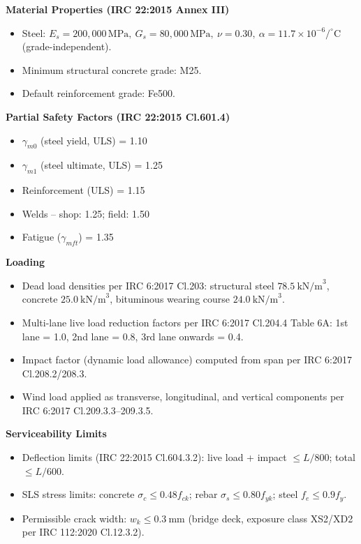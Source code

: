 \documentclass[12pt,a4paper]{report}
\numberwithin{figure}{chapter}
\begin{document}
\textbf{Material Properties (IRC 22:2015 Annex III)}

\begin{itemize}
\item Steel: $E_s = 200{,}000 \, \text{MPa}, \ G_s = 80{,}000 \, \text{MPa}, \ \nu = 0.30, \ \alpha = 11.7 \times 10^{-6}/^\circ\mathrm{C}$ (grade-independent).
\item Minimum structural concrete grade: M25.
\item Default reinforcement grade: Fe500.
\end{itemize}

\textbf{Partial Safety Factors (IRC 22:2015 Cl.601.4)}

\begin{itemize}
\item $\gamma_{m0}$ (steel yield, ULS) = 1.10
\item $\gamma_{m1}$ (steel ultimate, ULS) = 1.25
\item Reinforcement (ULS) = 1.15
\item Welds -- shop: 1.25; field: 1.50
\item Fatigue ($\gamma_{mft}$) = 1.35
\end{itemize}

\textbf{Loading}

\begin{itemize}
\item Dead load densities per IRC 6:2017 Cl.203: structural steel $78.5 \ \text{kN/m}^3$, concrete $25.0 \ \text{kN/m}^3$, bituminous wearing course $24.0 \ \text{kN/m}^3$.
\item Multi-lane live load reduction factors per IRC 6:2017 Cl.204.4 Table 6A: 1st lane = 1.0, 2nd lane = 0.8, 3rd lane onwards = 0.4.
\item Impact factor (dynamic load allowance) computed from span per IRC 6:2017 Cl.208.2/208.3.
\item Wind load applied as transverse, longitudinal, and vertical components per IRC 6:2017 Cl.209.3.3--209.3.5.
\end{itemize}

\textbf{Serviceability Limits}

\begin{itemize}
\item Deflection limits (IRC 22:2015 Cl.604.3.2): live load + impact $\leq L/800$; total $\leq L/600$.
\item SLS stress limits: concrete $\sigma_c \leq 0.48 f_{ck}$; rebar $\sigma_s \leq 0.80 f_{yk}$; steel $f_e \leq 0.9 f_y$.
\item Permissible crack width: $w_k \leq 0.3 \ \text{mm}$ (bridge deck, exposure class XS2/XD2 per IRC 112:2020 Cl.12.3.2).
\end{itemize}
\end{document}
